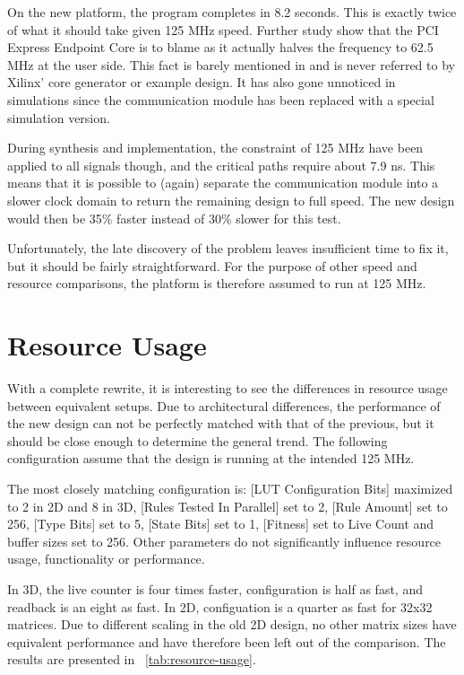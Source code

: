 On the new platform, the program completes in 8.2 seconds.
This is exactly twice of what it should take given 125 MHz speed.
Further study show that the PCI Express Endpoint Core is to blame as it actually halves the frequency to 62.5 MHz at the user side.
This fact is barely mentioned in \cite{ug672} and is never referred to by Xilinx' core generator or example design.
It has also gone unnoticed in simulations since the communication module has been replaced with a special simulation version.

During synthesis and implementation, the constraint of 125 MHz have been applied to all signals though, and the critical paths require about 7.9 ns.
This means that it is possible to (again) separate the communication module into a slower clock domain to return the remaining design to full speed.
The new design would then be 35\% faster instead of 30\% slower for this test.

Unfortunately, the late discovery of the problem leaves insufficient time to fix it, but it should be fairly straightforward.
For the purpose of other speed and resource comparisons, the platform is therefore assumed to run at 125 MHz.


\section{Resource Usage}

With a complete rewrite, it is interesting to see the differences in resource usage between equivalent setups.
Due to architectural differences, the performance of the new design can not be perfectly matched with that of the previous, but it should be close enough to determine the general trend.
The following configuration assume that the design is running at the intended 125 MHz.

The most closely matching configuration is:
[LUT Configuration Bits] maximized to 2 in 2D and 8 in 3D,
[Rules Tested In Parallel] set to 2,
[Rule Amount] set to 256,
[Type Bits] set to 5,
[State Bits] set to 1,
[Fitness] set to Live Count
and buffer sizes set to 256.
Other parameters do not significantly influence resource usage, functionality or performance.

In 3D, the live counter is four times faster, configuration is half as fast, and readback is an eight as fast.
In 2D, configuation is a quarter as fast for 32x32 matrices.
Due to different scaling in the old 2D design, no other matrix sizes have equivalent performance and have therefore been left out of the comparison.
The results are presented in \tablename~\ref{tab:resource-usage}.


